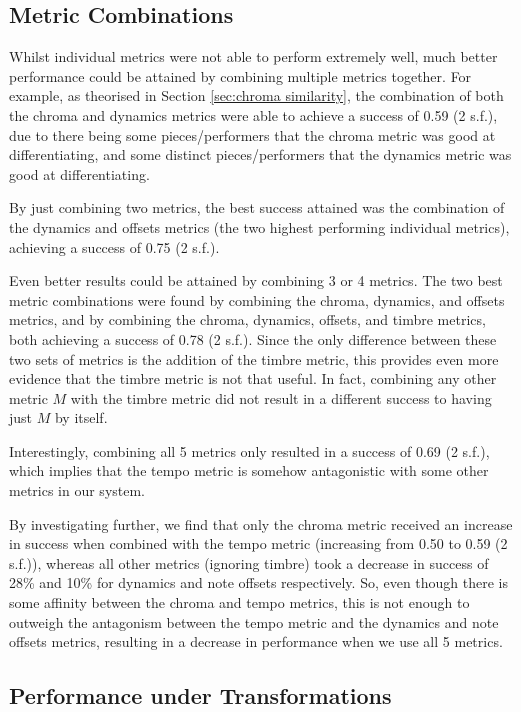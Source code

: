 \documentclass[oneside, class=book, 12pt, crop=false]{standalone}
\begin{document}

\subsection{Metric Combinations}

Whilst individual metrics were not able to perform extremely well, much better performance could be attained by combining multiple metrics together. For example, as theorised in Section \ref{sec:chroma similarity}, the combination of both the chroma and dynamics metrics were able to achieve a success of 0.59 (2 s.f.), due to there being some pieces/performers that the chroma metric was good at differentiating, and some distinct pieces/performers that the dynamics metric was good at differentiating.

By just combining two metrics, the best success attained was the combination of the dynamics and offsets metrics (the two highest performing individual metrics), achieving a success of 0.75 (2 s.f.).

Even better results could be attained by combining 3 or 4 metrics. The two best metric combinations were found by combining the chroma, dynamics, and offsets metrics, and by combining the chroma, dynamics, offsets, and timbre metrics, both achieving a success of 0.78 (2 s.f.). Since the only difference between these two sets of metrics is the addition of the timbre metric, this provides even more evidence that the timbre metric is not that useful. In fact, combining any other metric $M$ with the timbre metric did not result in a different success to having just $M$ by itself.

Interestingly, combining all 5 metrics only resulted in a success of 0.69 (2 s.f.), which implies that the tempo metric is somehow antagonistic with some other metrics in our system.

By investigating further, we find that only the chroma metric received an increase in success when combined with the tempo metric (increasing from 0.50 to 0.59 (2 s.f.)), whereas all other metrics (ignoring timbre) took a decrease in success of 28\% and 10\% for dynamics and note offsets respectively. So, even though there is some affinity between the chroma and tempo metrics, this is not enough to outweigh the antagonism between the tempo metric and the dynamics and note offsets metrics, resulting in a decrease in performance when we use all 5 metrics.

\subsection{Performance under Transformations}
\end{document}

